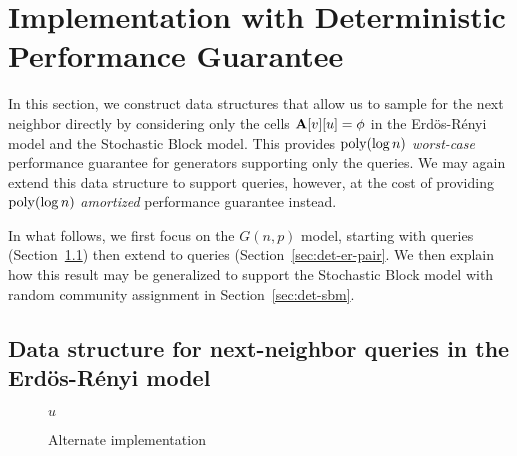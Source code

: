 \section{ Implementation with Deterministic Performance Guarantee}
\label{sec:ER-det}
In this section, we construct data structures that allow us to sample for the next neighbor directly by considering only the cells $\mathbf{A}[v][u]=\phi$ in the Erd\"{o}s-R\'{e}nyi model and the Stochastic Block model. This provides $\mathrm{poly}(\log n)$ \emph{worst-case} performance guarantee for generators supporting only the  queries. We may again extend this data structure to support  queries, however, at the cost of providing $\mathrm{poly}(\log n)$ \emph{amortized} performance guarantee instead.

In what follows, we first focus on the $G(n,p)$ model, starting with  queries (Section~\ref{sec:det-er}) then extend to  queries (Section~\ref{sec:det-er-pair}. We then explain how this result may be generalized to support the Stochastic Block model with random community assignment in Section~\ref{sec:det-sbm}.

\subsection{Data structure for next-neighbor queries in the Erd\"{o}s-R\'{e}nyi model}\label{sec:det-er}

\begin{wrapfigure}[14]{r}{0.42\textwidth}
\vspace{-1.5em}
\begin{framed}
    \renewcommand\figurename{Algorithm}
    \caption{Alternate implementation}
    \label{alg:exact-coin-toss}
    \begin{algorithmic}
            \Else
                \EndIf
            \EndIf
            \State \Return $u$
        \EndProcedure
    \end{algorithmic}
\end{framed}
\end{wrapfigure}


